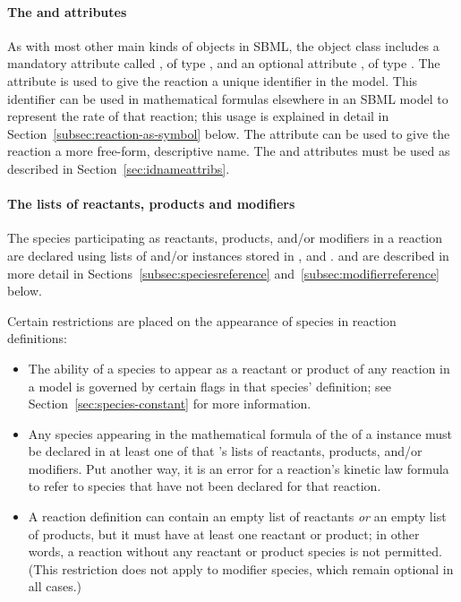 \paragraph{The  and  attributes}

As with most other main kinds of objects in SBML, the
\Reaction object class
includes a mandatory attribute called , of type
, and an optional attribute , of type
.  The  attribute is used to give the
reaction a unique identifier in the model.  This identifier can be
used in mathematical formulas elsewhere in an SBML model to
represent the rate of that reaction; this usage is explained in
detail in Section~\ref{subsec:reaction-as-symbol} below.  The
 attribute can be used to give the reaction a more
free-form, descriptive name.  The  and 
attributes must be used as described in
Section~\ref{sec:idnameattribs}.


\paragraph{The lists of reactants, products and modifiers}

The species participating as reactants, products, and/or modifiers
in a reaction are declared using lists of \SpeciesReference and/or
\ModifierSpeciesReference instances stored in
,  and
.
\SpeciesReference and
\ModifierSpeciesReference are described in more detail
in Sections~\ref{subsec:speciesreference}
and~\ref{subsec:modifierreference} below.

Certain restrictions are placed on the appearance of species in
reaction definitions:
\begin{itemize}
  
\item The ability of a species to appear as a reactant or product
  of any reaction in a model is governed by certain flags in that
  species' definition; see Section~\ref{sec:species-constant} for
  more information.
  
\item Any species appearing in the mathematical formula of the
   of a \Reaction instance must be declared in
  at least one of that \Reaction's lists of reactants, products,
  and/or modifiers.  Put another way, it is an error for a
  reaction's kinetic law formula to refer to species that have not
  been declared for that reaction.
  
\item A reaction definition can contain an empty list of reactants
  \emph{or} an empty list of products, but it must have at least
  one reactant or product; in other words, a reaction without any
  reactant or product species is not permitted.  (This restriction
  does not apply to modifier species, which remain optional in all
  cases.)

\end{itemize}


